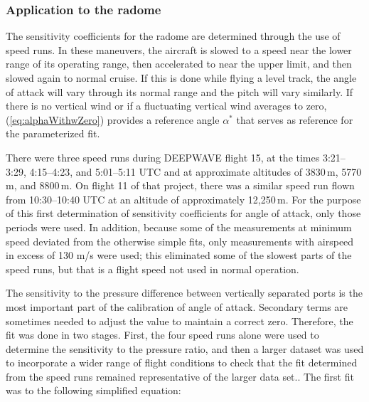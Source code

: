 \documentclass[12pt,twoside,english]{article}\usepackage[]{graphicx}\usepackage[]{color}
\newenvironment{lyxcode}
{\par\begin{list}{}{
\setlength{\rightmargin}{\leftmargin}
\setlength{\listparindent}{0pt}%
\raggedright
\setlength{\itemsep}{0pt}
\setlength{\parsep}{0pt}
\normalfont\ttfamily}%
 \item[]}
{\end{list}}
\let\OrgIndex\index
\renewcommand*{\index}[1]{\OrgIndex{#1}}
\begin{document}
\subsubsection{Application to the radome\label{sub:radome-sensitivity}}

The sensitivity coefficients for the radome are determined through the use of speed runs. In these maneuvers, the aircraft is slowed to a speed near the lower range of its operating range, then accelerated to near the upper limit, and then slowed again to normal cruise. If this is done while flying a level track, the angle of attack will vary through its normal range and the pitch will vary similarly. If there is no vertical wind or if a fluctuating vertical wind averages to zero, (\ref{eq:alphaWithwZero}) provides a reference angle $\alpha^{*}$ that serves as reference for the parameterized fit. 

There were three speed runs during DEEPWAVE flight 15, at the times 3:21--3:29, 4:15--4:23, and 5:01--5:11 UTC and at approximate altitudes of 3830\,m, 5770\,m, and 8800\,m. On flight 11 of that project, there was a similar speed run flown from 10:30--10:40 UTC at an altitude of approximately 12,250\,m. For the purpose of this first determination of sensitivity coefficients for angle of attack, only those periods were used. In addition, because some of the measurements at minimum speed deviated from the otherwise simple fits, only measurements with airspeed in excess of 130 m/s were used; this eliminated some of the slowest parts of the speed runs, but that is a flight speed not used in normal operation. 


The sensitivity to the pressure difference between vertically separated ports is the most important part of the calibration of angle of attack. Secondary terms are sometimes needed to adjust the value to maintain a correct zero. Therefore, the fit was done in two stages. First, the four speed runs alone were used to determine the sensitivity to the pressure ratio, and then a larger dataset was used to incorporate a wider range of flight conditions to check that the fit determined from the speed runs remained representative of the larger data set.. The first fit was to the following simplified equation: 
\end{document}
